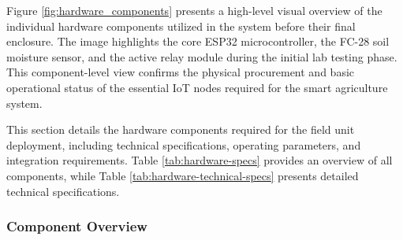 Figure \ref{fig:hardware_components} presents a high-level visual overview of the individual hardware components utilized in the system before their final enclosure. The image highlights the core ESP32 microcontroller, the FC-28 soil moisture sensor, and the active relay module during the initial lab testing phase. This component-level view confirms the physical procurement and basic operational status of the essential IoT nodes required for the smart agriculture system.


This section details the hardware components required for the field
unit deployment, including technical specifications, operating
parameters, and integration requirements. Table
\ref{tab:hardware-specs} provides an overview of all components,
while Table \ref{tab:hardware-technical-specs} presents detailed
technical specifications.

\renewcommand{\arraystretch}{1.2}
\setlength{\tabcolsep}{6pt}

\subsubsection{Component Overview}

\begingroup
\footnotesize

